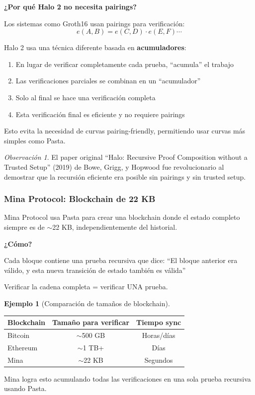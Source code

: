\documentclass[11pt,a4paper,twoside,openright]{book}
\theoremstyle{definition}
\newtheorem{example}{Ejemplo}[chapter]
\theoremstyle{plain}
\theoremstyle{remark}
\newtheorem{remark}{Observación}[chapter]
\begin{document}
\begin{keyidea}
\textbf{¿Por qué Halo 2 no necesita pairings?}

Los sistemas como Groth16 usan pairings para verificación:
\[ e(A, B) = e(C, D) \cdot e(E, F) \cdots \]

Halo 2 usa una técnica diferente basada en \textbf{acumuladores}:
\begin{enumerate}
    \item En lugar de verificar completamente cada prueba, ``acumula'' el trabajo
    \item Las verificaciones parciales se combinan en un ``acumulador''
    \item Solo al final se hace una verificación completa
    \item Esta verificación final es eficiente y no requiere pairings
\end{enumerate}

Esto evita la necesidad de curvas pairing-friendly, permitiendo usar curvas más simples como Pasta.
\end{keyidea}

\begin{remark}
El paper original ``Halo: Recursive Proof Composition without a Trusted Setup'' (2019) de Bowe, Grigg, y Hopwood fue revolucionario al demostrar que la recursión eficiente era posible sin pairings y sin trusted setup.
\end{remark}

\subsubsection{Mina Protocol: Blockchain de 22 KB}

\begin{intuicion}
Mina Protocol usa Pasta para crear una blockchain donde el estado completo siempre es de $\sim$22 KB, independientemente del historial.

\textbf{¿Cómo?}

Cada bloque contiene una prueba recursiva que dice:
``El bloque anterior era válido, y esta nueva transición de estado también es válida''

Verificar la cadena completa = verificar UNA prueba.
\end{intuicion}

\begin{example}[Comparación de tamaños de blockchain]
\begin{center}
\begin{tabular}{lcc}
\toprule
\textbf{Blockchain} & \textbf{Tamaño para verificar} & \textbf{Tiempo sync} \\
\midrule
Bitcoin & $\sim$500 GB & Horas/días \\
Ethereum & $\sim$1 TB+ & Días \\
Mina & $\sim$22 KB & Segundos \\
\bottomrule
\end{tabular}
\end{center}

Mina logra esto acumulando todas las verificaciones en una sola prueba recursiva usando Pasta.
\end{example}
\end{document}
